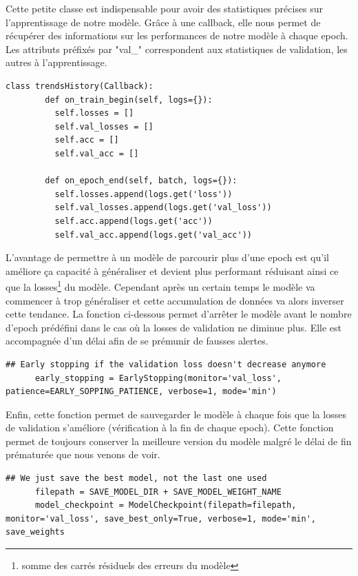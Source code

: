 \documentclass[a4paper,12pt]{report}
\begin{document}
      \medbreak
      Cette petite classe est indispensable pour avoir des statistiques précises sur l'apprentissage de notre modèle. Grâce à une callback, elle nous permet de récupérer des informations sur les performances de notre modèle à chaque epoch. Les attributs préfixés par "val\_" correspondent aux statistiques de validation, les autres à l'apprentissage.
      \begin{lstlisting}[title=cookedDishModel.py (l.177)]
      class trendsHistory(Callback):
        def on_train_begin(self, logs={}):
          self.losses = []
          self.val_losses = []
          self.acc = []
          self.val_acc = []
              
        def on_epoch_end(self, batch, logs={}):
          self.losses.append(logs.get('loss'))
          self.val_losses.append(logs.get('val_loss'))
          self.acc.append(logs.get('acc'))
          self.val_acc.append(logs.get('val_acc'))
      \end{lstlisting}

      \medbreak
      L'avantage de permettre à un modèle de parcourir plus d'une epoch est qu'il améliore ça capacité à généraliser et devient plus performant réduisant ainsi ce que la losses\footnote{somme des carrés résiduels des erreurs du modèle} du modèle. Cependant après un certain temps le modèle va commencer à trop généraliser et cette accumulation de données va alors inverser cette tendance. La fonction ci-dessous permet d'arrêter le modèle avant le nombre d'epoch prédéfini dans le cas où la losses de validation ne diminue plus. Elle est accompagnée d'un délai afin de se prémunir de fausses alertes.
      \begin{lstlisting}[title=cookedDishModel.py (l.191)]
      ## Early stopping if the validation loss doesn't decrease anymore
      early_stopping = EarlyStopping(monitor='val_loss', patience=EARLY_SOPPING_PATIENCE, verbose=1, mode='min')
      \end{lstlisting}

      \medbreak
      Enfin, cette fonction permet de sauvegarder le modèle à chaque fois que la losses de validation s'améliore (vérification à la fin de chaque epoch). Cette fonction permet de toujours conserver la meilleure version du modèle malgré le délai de fin prématurée que nous venons de voir.
      \begin{lstlisting}[title=cookedDishModel.py (l.194)]
      ## We just save the best model, not the last one used
      filepath = SAVE_MODEL_DIR + SAVE_MODEL_WEIGHT_NAME
      model_checkpoint = ModelCheckpoint(filepath=filepath, monitor='val_loss', save_best_only=True, verbose=1, mode='min', save_weights
      \end{lstlisting}
\end{document}
